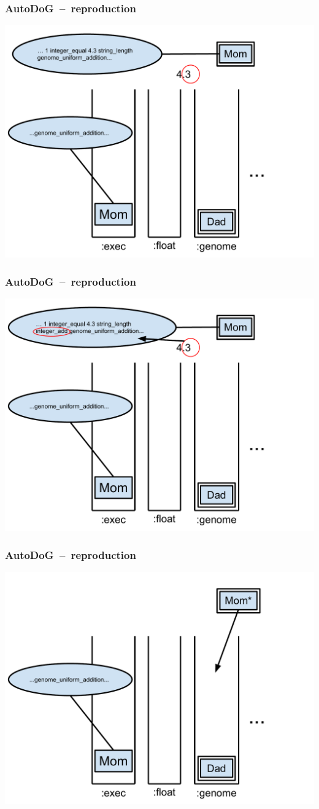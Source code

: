 \documentclass{beamer}
\begin{document}
\begin{frame}
	\frametitle{AutoDoG~--~reproduction}
	\includegraphics[width=.9\textwidth]{Illustrations/autodog_11.PDF}
\end{frame}

\begin{frame}
	\frametitle{AutoDoG~--~reproduction}
	\includegraphics[width=.9\textwidth]{Illustrations/autodog_12.PDF}
\end{frame}

\begin{frame}
	\frametitle{AutoDoG~--~reproduction}
	\includegraphics[width=.9\textwidth]{Illustrations/autodog_13.PDF}
\end{frame}
\end{document}

